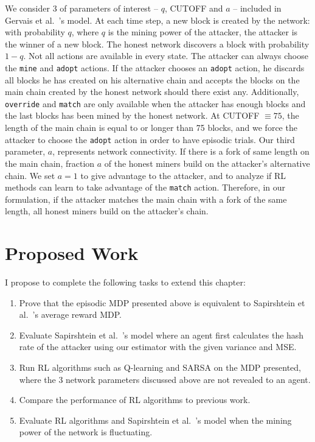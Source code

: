 We consider 3 of parameters of interest -- $q$, CUTOFF and $a$ -- included in Gervais et al.~\cite{Gervais:2016}'s model. At each time step, a new block is created by the network: with probability $q$, where $q$ is the mining power of the attacker, the attacker is the winner of a new block. The honest network discovers a block with probability $1-q$. Not all actions are available in every state. The attacker can always choose the \texttt{mine} and \texttt{adopt} actions. If the attacker chooses an {\tt adopt} action, he discards all blocks he has created on his alternative chain and accepts the blocks on the main chain created by the honest network should there exist any. Additionally, \texttt{override} and \texttt{match} are only available when the attacker has enough blocks and the last blocks has been mined by the honest network. At CUTOFF $\equiv 75$, the length of the main chain is equal to or longer than 75 blocks, and we force the attacker to choose the \texttt{adopt} action in order to have episodic trials. Our third parameter, $a$, represents network connectivity. If there is a fork of same length on the main chain, fraction $a$ of the honest miners build on the attacker's alternative chain. We set $a=1$ to give advantage to the attacker, and to analyze if RL methods can learn to take advantage of the \texttt{match} action. Therefore, in our formulation, if the attacker matches the main chain with a fork of the same length, all honest miners build on the attacker's chain. 

\section{Proposed Work}\label{section:selfishRL-proposed-work}
I propose to complete the following tasks to extend this chapter:
\begin{enumerate}
\item Prove that the episodic MDP presented above is equivalent to Sapirshtein et al.~\cite{sapirshtein:2015}'s average reward MDP.
\item Evaluate Sapirshtein et al.~\cite{sapirshtein:2015}'s model where an agent first calculates the hash rate of the attacker using our estimator with the given variance and MSE.
\item Run RL algorithms such as Q-learning and SARSA on the MDP presented, where the 3 network parameters discussed above are not revealed to an agent.
\item Compare the performance of RL algorithms to previous work.
\item Evaluate RL algorithms and Sapirshtein et al.~\cite{sapirshtein:2015}'s model when the mining power of the network is fluctuating.
\end{enumerate}

